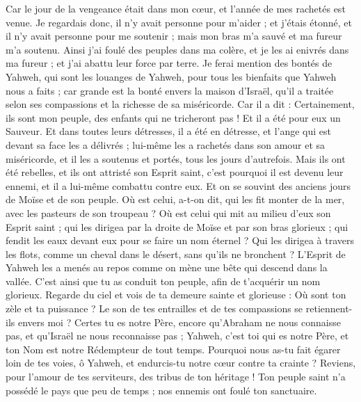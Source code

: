 \begin{multicols}{2}
Car le jour de la vengeance était dans mon cœur, et l'année de mes rachetés est venue.
Je regardais donc, il n'y avait personne pour m'aider ; et j'étais étonné, et il n'y avait personne pour me soutenir ; mais mon bras m'a sauvé et ma fureur m'a soutenu.
Ainsi j'ai foulé des peuples dans ma colère, et je les ai enivrés dans ma fureur ; et j'ai abattu leur force par terre.
Je ferai mention des bontés de Yahweh, qui sont les louanges de Yahweh, pour tous les bienfaits que Yahweh nous a faits ; car grande est la bonté envers la maison d'Israël, qu'il a traitée selon ses compassions et la richesse de sa miséricorde.
Car il a dit : Certainement, ils sont mon peuple, des enfants qui ne tricheront pas ! Et il a été pour eux un Sauveur.
Et dans toutes leurs détresses, il a été en détresse, et l'ange qui est devant sa face les a délivrés ; lui-même les a rachetés dans son amour et sa miséricorde, et il les a soutenus et portés, tous les jours d'autrefois.
Mais ils ont été rebelles, et ils ont attristé son Esprit saint, c'est pourquoi il est devenu leur ennemi, et il a lui-même combattu contre eux.
Et on se souvint des anciens jours de Moïse et de son peuple. Où est celui, a-t-on dit, qui les fit monter de la mer, avec les pasteurs de son troupeau ? Où est celui qui mit au milieu d'eux son Esprit saint ;
qui les dirigea par la droite de Moïse et par son bras glorieux ; qui fendit les eaux devant eux pour se faire un nom éternel ?
Qui les dirigea à travers les flots, comme un cheval dans le désert, sans qu'ils ne bronchent ?
L'Esprit de Yahweh les a menés au repos comme on mène une bête qui descend dans la vallée. C'est ainsi que tu as conduit ton peuple, afin de t'acquérir un nom glorieux.
Regarde du ciel et vois de ta demeure sainte et glorieuse : Où sont ton zèle et ta puissance ? Le son de tes entrailles et de tes compassions se retiennent-ils envers moi ?
Certes tu es notre Père, encore qu'Abraham ne nous connaisse pas, et qu'Israël ne nous reconnaisse pas ; Yahweh, c'est toi qui es notre Père, et ton Nom est notre Rédempteur de tout temps.
Pourquoi nous as-tu fait égarer loin de tes voies, ô Yahweh, et endurcis-tu notre cœur contre ta crainte ? Reviens, pour l'amour de tes serviteurs, des tribus de ton héritage !
Ton peuple saint n'a possédé le pays que peu de temps ; nos ennemis ont foulé ton sanctuaire.

\end{multicols}
